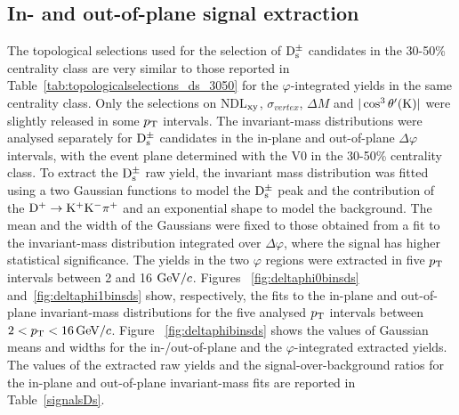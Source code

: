 \subsection{In- and out-of-plane signal extraction}
 \label{sec:SigExtracV2}
 The topological selections used for the selection of ${\rm D_s^{\pm}}$ candidates in the 30-50\% centrality class
 are very similar to those reported in Table~\ref{tab:topologicalselections_ds_3050} for the
 $\varphi$-integrated yields in the same centrality class.
 Only the selections on NDL$_{\rm xy}$, $\sigma_{vertex}$, $\Delta M$ 
 and $|\cos^3 \theta^\prime({\rm K})|$ were slightly released in some $p_{\rm T}$
 intervals. The invariant-mass distributions were analysed separately for ${\rm D_s^{\pm}}$ candidates
 in the in-plane and out-of-plane $\Delta \varphi$ intervals, 
with the event plane determined with the V0 
in the 30-50\% centrality class. To extract the ${\rm D_s^{\pm}}$ raw yield, the invariant mass distribution was fitted using a two Gaussian
functions to model the ${\rm D_s^{\pm}}$ peak and the contribution of the ${\rm D^{+}\to K^+ K^-\pi^+}$ and 
an exponential shape to model the background.
The mean and the width of the Gaussians were fixed to those obtained from a fit to
the invariant-mass distribution integrated over $\Delta \varphi$, 
where the signal has higher statistical significance. 
The yields in the two $\varphi$ regions were extracted in five $p_{\rm T}$ 
intervals between 2 and 16 $\mathrm{GeV}/c$.
Figures ~\ref{fig:deltaphi0binsds} and~\ref{fig:deltaphi1binsds} show, respectively, the fits to the in-plane and out-of-plane
invariant-mass distributions for the five analysed $p_{\rm T}$ intervals between $2 < p_{\rm T} <16 \, \mathrm{GeV}/c$.
Figure ~\ref{fig:deltaphibinsds} shows the values of Gaussian means and 
widths for the in-/out-of-plane and the $\varphi$-integrated extracted yields.
The values of the extracted raw yields and the signal-over-background 
ratios for the in-plane and out-of-plane invariant-mass fits 
are reported in Table~\ref{signalsDs}.

